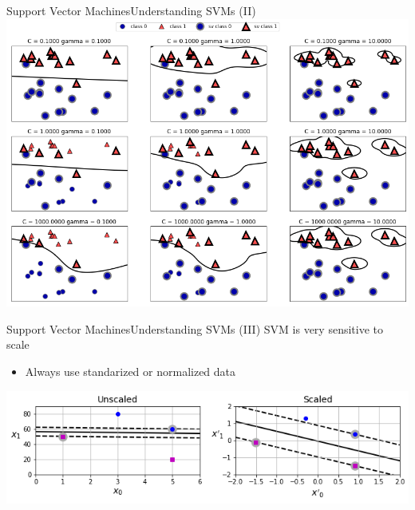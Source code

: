 \documentclass[10pt,compress]{beamer} %
\begin{document}
\begin{frame}[plain]{Support Vector Machines}{Understanding SVMs (II)}
    \includegraphics[width=0.9\linewidth]{figs/svm-hyperparam.png}
\end{frame}

\begin{frame}{Support Vector Machines}{Understanding SVMs (III)}
    SVM is very sensitive to scale
    \begin{itemize}
        \item Always use standarized or normalized data
    \end{itemize}

    \bigskip

    \includegraphics[width=0.9\linewidth]{figs/svm-scale.png}
\end{frame}
\end{document}
